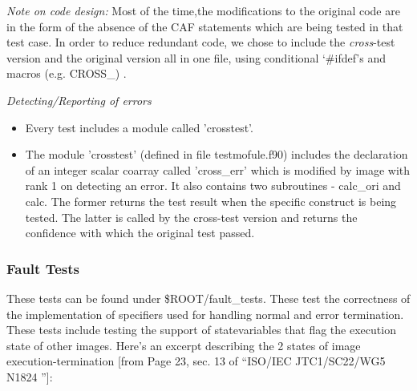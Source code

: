 {\small 
\emph{Note on code design:} Most of the time,the modifications to the original code are in the form of the absence of the CAF statements which are being tested in that test case. In order to reduce redundant code, we chose to include the \emph{cross}-test version and the original version all in one file, using conditional `\#ifdef's and macros (e.g. CROSS\_) .

\emph{Detecting/Reporting of errors}

\begin{itemize}
\item Every test includes a module called 'crosstest'.
\item The module 'crosstest' (defined in file testmofule.f90)
includes the declaration of an integer scalar coarray called
'cross\_err' which is modified by image with rank 1 on detecting
an error. It also contains two subroutines - calc\_ori and calc.
The former returns the test result when the specific construct
is being tested. The latter is called by the cross-test version
and returns the confidence with which the original test passed.
\end{itemize}
}


\subsubsection{Fault Tests}

These tests can be found under \$ROOT/fault\_tests.
These test the correctness of the implementation of specifiers
used for handling normal and error termination. These tests include testing the support of statevariables that flag the execution state of other images. Here's an
excerpt describing the 2 states of image execution-termination [from Page 23, sec. 13 of ``ISO/IEC JTC1/SC22/WG5 N1824 ''\cite{Numrich:2005:CNF}]:

